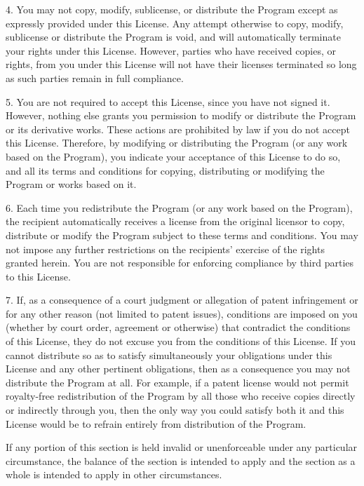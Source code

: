 \documentclass{doc}
\begin{document}
  4. You may not copy, modify, sublicense, or distribute the Program
except as expressly provided under this License.  Any attempt
otherwise to copy, modify, sublicense or distribute the Program is
void, and will automatically terminate your rights under this License.
However, parties who have received copies, or rights, from you under
this License will not have their licenses terminated so long as such
parties remain in full compliance.

  5. You are not required to accept this License, since you have not
signed it.  However, nothing else grants you permission to modify or
distribute the Program or its derivative works.  These actions are
prohibited by law if you do not accept this License.  Therefore, by
modifying or distributing the Program (or any work based on the
Program), you indicate your acceptance of this License to do so, and
all its terms and conditions for copying, distributing or modifying
the Program or works based on it.

  6. Each time you redistribute the Program (or any work based on the
Program), the recipient automatically receives a license from the
original licensor to copy, distribute or modify the Program subject to
these terms and conditions.  You may not impose any further
restrictions on the recipients' exercise of the rights granted herein.
You are not responsible for enforcing compliance by third parties to
this License.

  7. If, as a consequence of a court judgment or allegation of patent
infringement or for any other reason (not limited to patent issues),
conditions are imposed on you (whether by court order, agreement or
otherwise) that contradict the conditions of this License, they do not
excuse you from the conditions of this License.  If you cannot
distribute so as to satisfy simultaneously your obligations under this
License and any other pertinent obligations, then as a consequence you
may not distribute the Program at all.  For example, if a patent
license would not permit royalty-free redistribution of the Program by
all those who receive copies directly or indirectly through you, then
the only way you could satisfy both it and this License would be to
refrain entirely from distribution of the Program.

If any portion of this section is held invalid or unenforceable under
any particular circumstance, the balance of the section is intended to
apply and the section as a whole is intended to apply in other
circumstances.
\end{document}
